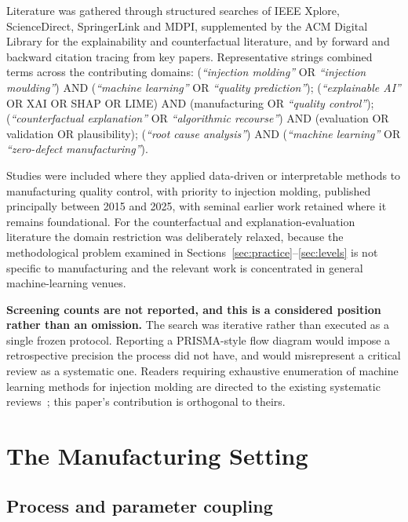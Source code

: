 \documentclass[11pt,a4paper]{article}
\begin{document}
Literature was gathered through structured searches of IEEE Xplore, ScienceDirect, SpringerLink and MDPI, supplemented by the ACM Digital Library for the explainability and counterfactual literature, and by forward and backward citation tracing from key papers. Representative strings combined terms across the contributing domains: (\emph{``injection molding''} OR \emph{``injection moulding''}) AND (\emph{``machine learning''} OR \emph{``quality prediction''}); (\emph{``explainable AI''} OR XAI OR SHAP OR LIME) AND (manufacturing OR \emph{``quality control''}); (\emph{``counterfactual explanation''} OR \emph{``algorithmic recourse''}) AND (evaluation OR validation OR plausibility); (\emph{``root cause analysis''}) AND (\emph{``machine learning''} OR \emph{``zero-defect manufacturing''}).

Studies were included where they applied data-driven or interpretable methods to manufacturing quality control, with priority to injection molding, published principally between 2015 and 2025, with seminal earlier work retained where it remains foundational. For the counterfactual and explanation-evaluation literature the domain restriction was deliberately relaxed, because the methodological problem examined in Sections~\ref{sec:practice}--\ref{sec:levels} is not specific to manufacturing and the relevant work is concentrated in general machine-learning venues.

\textbf{Screening counts are not reported, and this is a considered position rather than an omission.} The search was iterative rather than executed as a single frozen protocol. Reporting a PRISMA-style flow diagram would impose a retrospective precision the process did not have, and would misrepresent a critical review as a systematic one. Readers requiring exhaustive enumeration of machine learning methods for injection molding are directed to the existing systematic reviews~\cite{selvaraj2022,hoffmann2023}; this paper's contribution is orthogonal to theirs.

\section{The Manufacturing Setting}\label{sec:setting}

\subsection{Process and parameter coupling}
\end{document}
